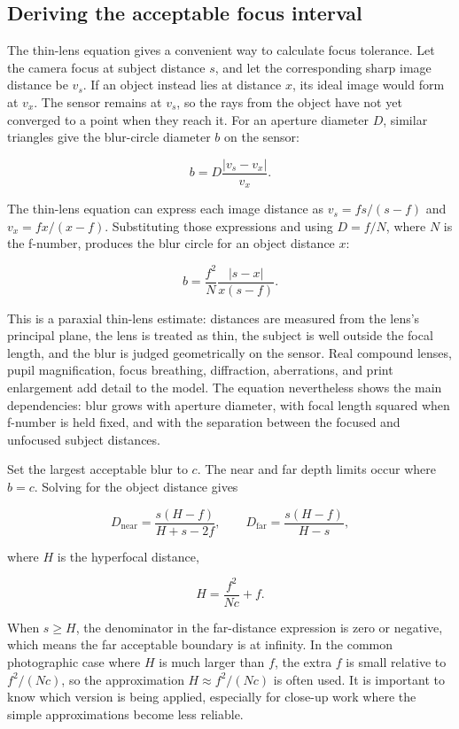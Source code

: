 \subsection{Deriving the acceptable focus interval}\label{03-visual-computing-i-ch003-deriving-the-acceptable-focus-interval}

The thin-lens equation gives a convenient way to calculate focus tolerance. Let the camera focus at subject distance \(s\), and let the corresponding sharp image distance be \(v_s\). If an object instead lies at distance \(x\), its ideal image would form at \(v_x\). The sensor remains at \(v_s\), so the rays from the object have not yet converged to a point when they reach it. For an aperture diameter \(D\), similar triangles give the blur-circle diameter \(b\) on the sensor:

\[
b = D\frac{|v_s-v_x|}{v_x}.
\]

The thin-lens equation can express each image distance as \(v_s=fs/(s-f)\) and \(v_x=fx/(x-f)\). Substituting those expressions and using \(D=f/N\), where \(N\) is the f-number, produces the blur circle for an object distance \(x\):

\[
b=\frac{f^2}{N}\frac{|s-x|}{x(s-f)}.
\]

This is a paraxial thin-lens estimate: distances are measured from the lens's principal plane, the lens is treated as thin, the subject is well outside the focal length, and the blur is judged geometrically on the sensor. Real compound lenses, pupil magnification, focus breathing, diffraction, aberrations, and print enlargement add detail to the model. The equation nevertheless shows the main dependencies: blur grows with aperture diameter, with focal length squared when f-number is held fixed, and with the separation between the focused and unfocused subject distances.

Set the largest acceptable blur to \(c\). The near and far depth limits occur where \(b=c\). Solving for the object distance gives

\[
D_{\mathrm{near}}=\frac{s(H-f)}{H+s-2f},\qquad
D_{\mathrm{far}}=\frac{s(H-f)}{H-s},
\]

where \(H\) is the hyperfocal distance,

\[
H=\frac{f^2}{Nc}+f.
\]

When \(s\ge H\), the denominator in the far-distance expression is zero or negative, which means the far acceptable boundary is at infinity. In the common photographic case where \(H\) is much larger than \(f\), the extra \(f\) is small relative to \(f^2/(Nc)\), so the approximation \(H\approx f^2/(Nc)\) is often used. It is important to know which version is being applied, especially for close-up work where the simple approximations become less reliable.

